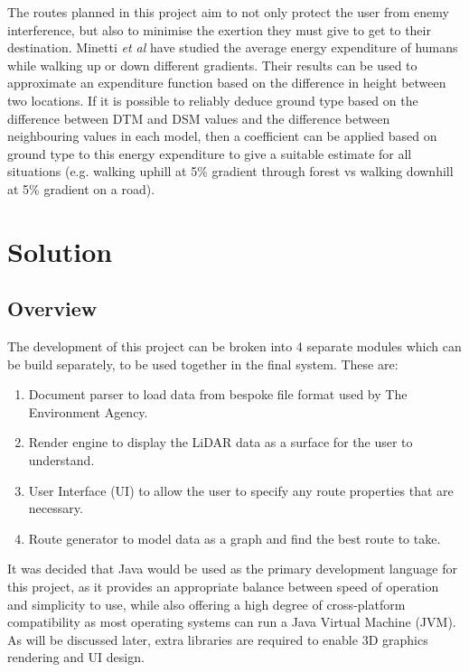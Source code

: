 \documentclass[12pt,a4paper]{article}
\begin{document}
  \par The routes planned in this project aim to not only protect the user from enemy interference, but also to minimise the exertion they must give to get to their destination. Minetti \textit{et al} have studied the average energy expenditure of humans while walking up or down different gradients. \citeyear{minetti2002energy} Their results can be used to approximate an expenditure function based on the difference in height between two locations. If it is possible to reliably deduce ground type based on the difference between DTM and DSM values and the difference between neighbouring values in each model, then a coefficient can be applied based on ground type to this energy expenditure to give a suitable estimate for all situations (e.g. walking uphill at  5\% gradient through forest vs walking downhill at 5\% gradient on a road).

\section{Solution}
  \subsection{Overview}
  \noindent The development of this project can be broken into 4 separate modules which can be build separately, to be used together in the final system. These are:
  \begin{enumerate}
    \item Document parser to load data from bespoke file format used by The Environment Agency.
    \item Render engine to display the LiDAR data as a surface for the user to understand.
    \item User Interface (UI) to allow the user to specify any route properties that are necessary.
    \item Route generator to model data as a graph and find the best route to take.
  \end{enumerate}

  It was decided that Java would be used as the primary development language for this project, as it provides an appropriate balance between speed of operation and simplicity to use, while also offering a high degree of cross-platform compatibility as most operating systems can run a Java Virtual Machine (JVM). As will be discussed later, extra libraries are required to enable 3D graphics rendering and UI design.
\end{document}
